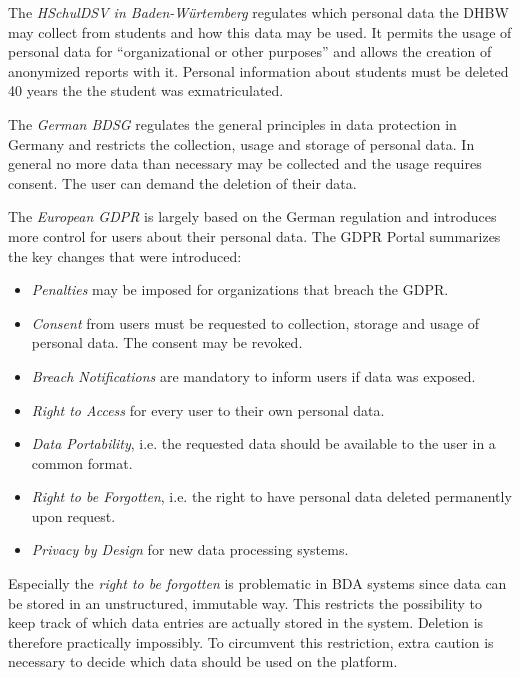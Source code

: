 The \emph{\ac{HSchulDSV} in Baden-Würtemberg}  regulates which personal data the \ac{DHBW} may collect from students and how this data may be used.
It permits the usage of personal data for \enquote{organizational or other purposes} and allows the creation of anonymized reports with it.
Personal information about students must be deleted 40 years the the student was exmatriculated. 
\autocite[][§1, §11, §12]{bw2012hcchuldsv}

The \emph{German \ac{BDSG}} regulates the general principles in data protection in Germany 
and restricts the collection, usage and storage of personal data.
In general no more data than necessary may be collected and the usage requires consent. 
The user can demand the deletion of their data.
\autocite[][§1ff., §12ff.]{bmjv2009bdsg}

The \emph{European \ac{GDPR}} is largely based
on the German regulation and introduces more control for users about their personal data.
\autocite{eu2016gdpr}
The \ac{GDPR} Portal \autocite{trunomi2018gdpr} summarizes the key changes that were introduced:
\begin{itemize}
    \item \emph{Penalties} may be imposed for organizations that breach the \ac{GDPR}.
    \item \emph{Consent} from users must be requested to collection, storage and usage of personal data. The consent may be revoked.
    \item \emph{Breach Notifications} are mandatory to inform users if data was exposed.
    \item \emph{Right to Access} for every user to their own personal data.
    \item \emph{Data Portability}, i.e. the requested data should be available to the user in a common format.
    \item \emph{Right to be Forgotten}, i.e. the right to have personal data deleted permanently upon request.
    \item \emph{Privacy by Design} for new data processing systems.
\end{itemize}

Especially the \emph{right to be forgotten} is problematic in \ac{BDA} systems
since data can be stored in an unstructured, immutable way. 
This restricts the possibility to keep track of which data entries are actually stored in the system. Deletion is therefore practically impossibly. 
To circumvent this restriction, extra caution is necessary to decide which data should be used on the platform. 

